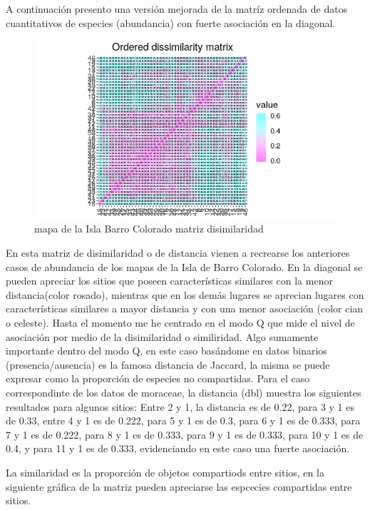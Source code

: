 \documentclass[11pt,]{article}
\begin{document}
A continuación presento una versión mejorada de la matríz ordenada de
datos cuantitativos de especies (abundancia) con fuerte asociación en la
diagonal.

\begin{figure}
\centering
\includegraphics[width=1.00000\textwidth]{matrizdedisimilaridad.png}
\caption{mapa de la Isla Barro Colorado matriz disimilaridad
\label{fig:bci_map}}
\end{figure}

En esta matriz de disimilaridad o de distancia vienen a recrearse los
anteriores casos de abundancia de los mapas de la Isla de Barro
Colorado. En la diagonal se pueden apreciar los sitios que poseen
características similares con la menor distancia(color rosado), mientras
que en los demás lugares se aprecian lugares con características
similares a mayor distancia y con una menor asociación (color cian o
celeste). Hasta el momento me he centrado en el modo Q que mide el nivel
de asociación por medio de la disimilaridad o similiridad. Algo
sumamente importante dentro del modo Q, en este caso basándome en datos
binarios (presencia/ausencia) es la famosa distancia de Jaccard, la
misma se puede expresar como la proporción de especies no compartidas.
Para el caso correspondinte de los datos de moraceae, la distancia (dbl)
muestra los siguientes resultados para algunos sitios: Entre 2 y 1, la
distancia es de 0.22, para 3 y 1 es de 0.33, entre 4 y 1 es de 0.222,
para 5 y 1 es de 0.3, para 6 y 1 es de 0.333, para 7 y 1 es de 0.222,
para 8 y 1 es de 0.333, para 9 y 1 es de 0.333, para 10 y 1 es de 0.4, y
para 11 y 1 es de 0.333, evidenciando en este caso una fuerte
asociación.

La similaridad es la proporción de objetos compartiods entre sitios, en
la siguiente gráfica de la matriz pueden apreciarse las espcecies
compartidas entre sitios.
\end{document}
